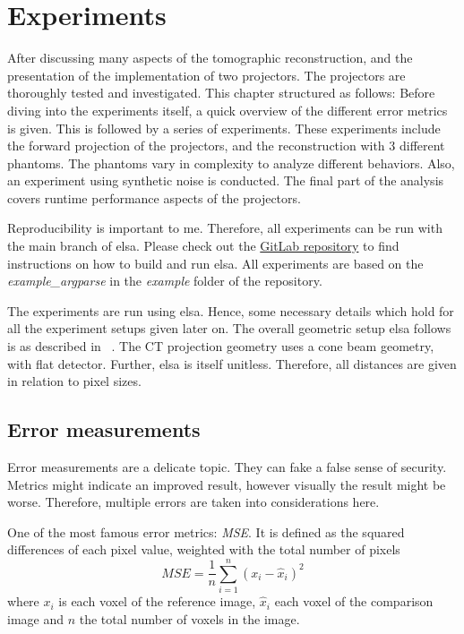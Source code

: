 \chapter{Experiments}\label{chap:experiments}

After discussing many aspects of the tomographic reconstruction, and the presentation of
the implementation of two projectors. The projectors are thoroughly tested and investigated. This
chapter structured as follows: Before diving into the experiments itself, a quick overview of the
different error metrics is given. This is followed by a series of experiments. These experiments
include the forward projection of the projectors, and the reconstruction with 3 different phantoms.
The phantoms vary in complexity to analyze different behaviors. Also, an experiment using synthetic
noise is conducted. The final part of the analysis covers runtime performance aspects of the
projectors.

Reproducibility is important to me. Therefore, all experiments can be run with the main branch of
elsa. Please check out the \href{https://gitlab.lrz.de/IP/elsa}{GitLab repository} to find
instructions on how to build and run elsa. All experiments are based on the
\textit{example\_argparse} in the \textit{example} folder of the repository.

The experiments are run using elsa. Hence, some necessary details which hold for all the experiment
setups given later on. The overall geometric setup elsa follows is as described in
\citeauthor{hartley_multiple_2003}~\cite{hartley_multiple_2003}. The CT projection geometry uses a
cone beam geometry, with flat detector. Further, elsa is itself unitless. Therefore, all distances
are given in relation to pixel sizes.

\section{Error measurements}\label{sec:error_measurements}

Error measurements are a delicate topic. They can fake a false sense of security. Metrics might
indicate an improved result, however visually the result might be worse. Therefore, multiple errors
are taken into considerations here.

\begin{definition}
	One of the most famous error metrics: \textit{\gls{MSE}}. It is defined as the
	squared differences of each pixel value, weighted with the total number of pixels
	\[ MSE = \frac{1}{n} \sum_{i=1}^{n}(x_i - \hat{x}_i)^2\]
	where \(x_i\) is each voxel of the reference image, \(\hat{x}_i\) each voxel of the comparison
	image and \(n\) the total number of voxels in the image.
\end{definition}

